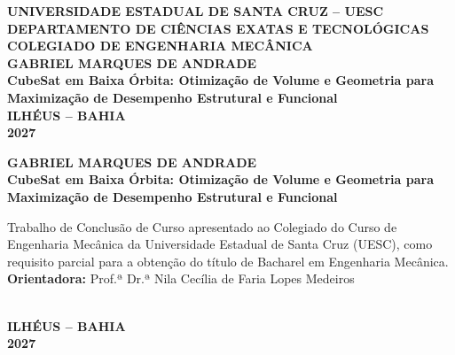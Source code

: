 \documentclass[12pt,a4paper]{report}
\begin{document}
\begin{titlepage}
\begin{center}
    {\large \textbf{UNIVERSIDADE ESTADUAL DE SANTA CRUZ -- UESC}}\\[0.3cm]
    {\large \textbf{DEPARTAMENTO DE CIÊNCIAS EXATAS E TECNOLÓGICAS}}\\[0.3cm]
    {\large \textbf{COLEGIADO DE ENGENHARIA MECÂNICA}}\\[4.0cm]

    {\large \textbf{GABRIEL MARQUES DE ANDRADE}}\\[3.5cm]

    {\Large \textbf{CubeSat em Baixa Órbita: Otimização de Volume e Geometria para Maximização de Desempenho Estrutural e Funcional}}\\[4.5cm]

    {\large \textbf{ILHÉUS -- BAHIA}}\\[0.2cm]
    {\large \textbf{2027}}
\end{center}
\end{titlepage}

\begin{titlepage}
\begin{center}
    {\large \textbf{GABRIEL MARQUES DE ANDRADE}}\\[4.0cm]

    {\Large \textbf{CubeSat em Baixa Órbita: Otimização de Volume e Geometria para Maximização de Desempenho Estrutural e Funcional}}\\[2.5cm]

    \hspace{.45\textwidth}
    \begin{minipage}{.5\textwidth}
    \singlespacing
    \small
    Trabalho de Conclusão de Curso apresentado ao Colegiado do Curso de Engenharia Mecânica da Universidade Estadual de Santa Cruz (UESC), como requisito parcial para a obtenção do título de Bacharel em Engenharia Mecânica.\\[0.8cm]
    \textbf{Orientadora:} Prof.ª Dr.ª Nila Cecília de Faria Lopes Medeiros
    \end{minipage}\\[4.5cm]

    {\large \textbf{ILHÉUS -- BAHIA}}\\[0.2cm]
    {\large \textbf{2027}}
\end{center}
\end{titlepage}
\end{document}
